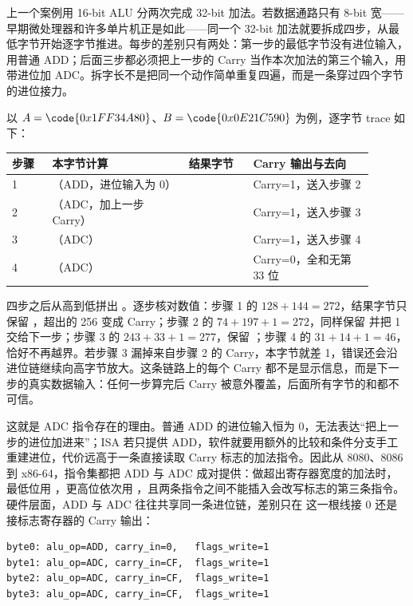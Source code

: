 上一个案例用 16-bit ALU 分两次完成 32-bit 加法。若数据通路只有 8-bit 宽——早期微处理器和许多单片机正是如此——同一个 32-bit 加法就要拆成四步，从最低字节开始逐字节推进。每步的差别只有两处：第一步的最低字节没有进位输入，用普通 ADD；后面三步都必须把上一步的 Carry 当作本次加法的第三个输入，用带进位加 ADC。拆字长不是把同一个动作简单重复四遍，而是一条穿过四个字节的进位接力。

以 $A=\code{0x1FF34A80}$、$B=\code{0x0E21C590}$ 为例，逐字节 trace 如下：

\begin{longtable}{L{0.1\linewidth}L{0.34\linewidth}L{0.16\linewidth}L{0.3\linewidth}}
\toprule
步骤 & 本字节计算 & 结果字节 & Carry 输出与去向 \\
 & （ADD，进位输入为 0） &  & Carry=1，送入步骤 2 \\
2 & （ADC，加上一步 Carry） &  & Carry=1，送入步骤 3 \\
3 & （ADC） &  & Carry=1，送入步骤 4 \\
4 & （ADC） &  & Carry=0，全和无第 33 位 \\
\bottomrule
\end{longtable}

四步之后从高到低拼出 。逐步核对数值：步骤 1 的 $128+144=272$，结果字节只保留 ，超出的 256 变成 Carry；步骤 2 的 $74+197+1=272$，同样保留  并把 1 交给下一步；步骤 3 的 $243+33+1=277$，保留 ；步骤 4 的 $31+14+1=46$，恰好不再越界。若步骤 3 漏掉来自步骤 2 的 Carry，本字节就差 1，错误还会沿进位链继续向高字节放大。这条链路上的每个 Carry 都不是显示信息，而是下一步的真实数据输入：任何一步算完后 Carry 被意外覆盖，后面所有字节的和都不可信。

这就是 ADC 指令存在的理由。普通 ADD 的进位输入恒为 0，无法表达“把上一步的进位加进来”；ISA 若只提供 ADD，软件就要用额外的比较和条件分支手工重建进位，代价远高于一条直接读取 Carry 标志的加法指令。因此从 8080、8086 到 x86-64，指令集都把 ADD 与 ADC 成对提供：做超出寄存器宽度的加法时，最低位用 ，更高位依次用 ，且两条指令之间不能插入会改写标志的第三条指令。硬件层面，ADD 与 ADC 往往共享同一条进位链，差别只在  这一根线接 0 还是接标志寄存器的 Carry 输出：

\begin{lstlisting}
byte0: alu_op=ADD, carry_in=0,   flags_write=1
byte1: alu_op=ADC, carry_in=CF,  flags_write=1
byte2: alu_op=ADC, carry_in=CF,  flags_write=1
byte3: alu_op=ADC, carry_in=CF,  flags_write=1
\end{lstlisting}

